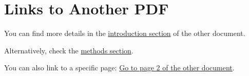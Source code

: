 \documentclass{article}
\begin{document}
\section{Links to Another PDF}

You can find more details in the 
\hyperref[./otherdocument.pdf#nameddest=introduction]{introduction section} of the other document.

Alternatively, check the 
\hyperref[./otherdocument.pdf#nameddest=methods]{methods section}.

You can also link to a specific page:
\hyperref[./otherdocument.pdf#page=2]{Go to page 2 of the other document}.
\end{document}
